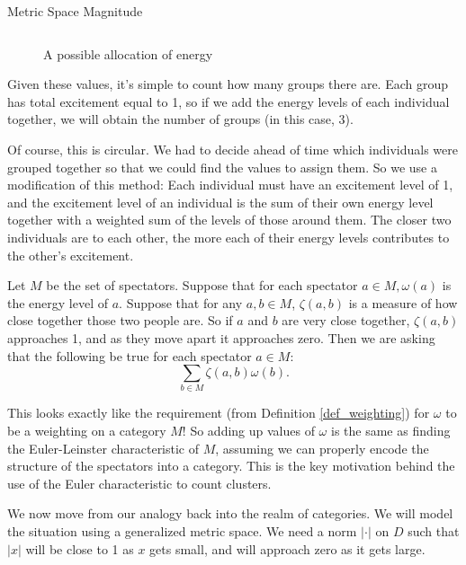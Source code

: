 \documentclass[12pt]{pom_thesis}
\begin{document}
\begin{chapter}{Metric Space Magnitude}
\begin{figure}[h]
\[\]
\caption{A possible allocation of energy}
\label{fig:sports_labeled}
\end{figure}
Given these values, it's simple to count how many groups there are. Each group has total excitement equal to 1, so if we add the energy levels of each individual together, we will obtain the number of groups (in this case, 3).

Of course, this is circular. We had to decide ahead of time which individuals were grouped together so that we could find the values to assign them. So we use a modification of this method: Each individual must have an excitement level of 1, and the excitement level of an individual is the sum of their own energy level together with a weighted sum of the levels of those around them. The closer two individuals are to each other, the more each of their energy levels contributes to the other's excitement. 

Let $M$ be the set of spectators. Suppose that for each spectator $a \in M, \omega(a)$ is the energy level of $a$. Suppose that for any $a,b \in M$, $\zeta(a,b)$ is a measure of how close together those two people are. So if $a$ and $b$ are very close together, $\zeta(a,b)$ approaches 1, and as they move apart it approaches zero. Then we are asking that the following be true for each spectator $a \in M$:
\[
\sum_{b \in M}\zeta(a,b)\omega(b).
\]

This looks exactly like the requirement (from Definition \ref{def_weighting}) for $\omega$ to be a weighting on a category $M$! So adding up values of $\omega$ is the same as finding the Euler-Leinster characteristic of $M$, assuming we can properly encode the structure of the spectators into a category. This is the key motivation behind the use of the Euler characteristic to count clusters.

We now move from our analogy back into the realm of categories. We will model the situation using a generalized metric space. We need a norm $|\cdot|$ on $D$ such that $|x|$ will be close to 1 as $x$ gets small, and will approach zero as it gets large. 


\end{chapter}
\end{document}
